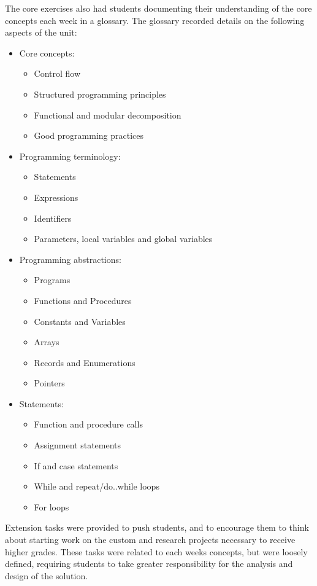 The core exercises also had students documenting their understanding of the core concepts each week in a glossary. The glossary recorded details on the following aspects of the unit:
\begin{itemize}[noitemsep, nolistsep]
	\item Core concepts:
	\begin{itemize}[noitemsep, nolistsep]
		\item Control flow
		\item Structured programming principles
		\item Functional and modular decomposition
		\item Good programming practices
	\end{itemize}
	\item Programming terminology:
	\begin{itemize}[noitemsep, nolistsep]
		\item Statements
		\item Expressions
		\item Identifiers
		\item Parameters, local variables and global variables
	\end{itemize}
	\item Programming abstractions:
	\begin{itemize}[noitemsep, nolistsep]
		\item Programs
		\item Functions and Procedures
		\item Constants and Variables
		\item Arrays
		\item Records and Enumerations
		\item Pointers
	\end{itemize}
	\item Statements:
	\begin{itemize}[noitemsep, nolistsep]
		\item Function and procedure calls
		\item Assignment statements
		\item If and case statements
		\item While and repeat/do..while loops
		\item For loops
	\end{itemize}
\end{itemize}

Extension tasks were provided to push students, and to encourage them to think about starting work on the custom and research projects necessary to receive higher grades. These tasks were related to each weeks concepts, but were loosely defined, requiring students to take greater responsibility for the analysis and design of the solution.


